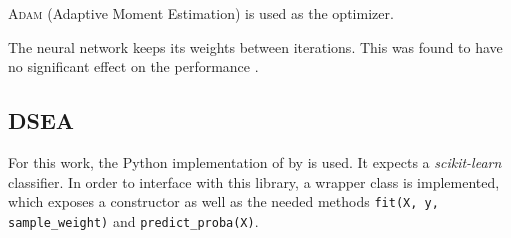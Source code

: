 
\textsc{Adam} (Adaptive Moment Estimation) \cite{adam} is used as the optimizer.

The neural network keeps its weights between \dsea{} iterations.
This was found to have no significant effect on the performance \cite{dsea_samuel}. %


\subsection{DSEA}
For this work, the Python implementation of \dsea{} \cite{dsea_code} by \citeauthor{dsea_mirko} is used.
It expects a \emph{scikit-learn} classifier.
In order to interface with this library,
a wrapper class is implemented,
  which exposes a constructor as well as the needed methods
  \texttt{fit(X, y, sample_weight)} and
  \texttt{predict_proba(X)}.
